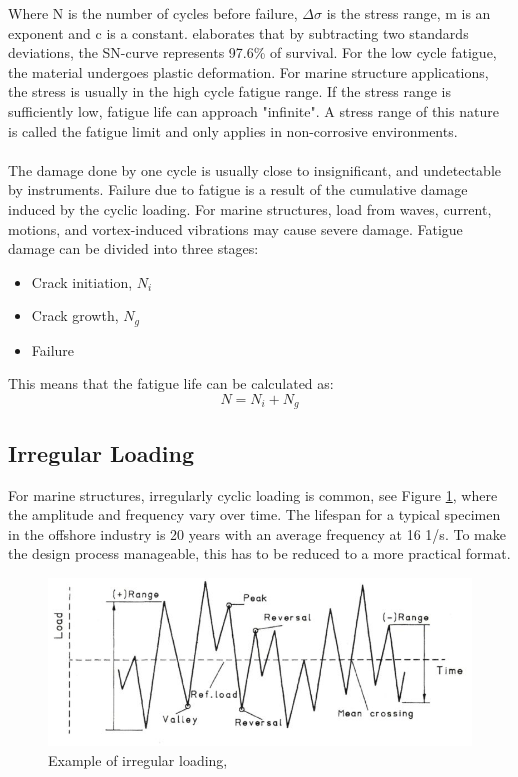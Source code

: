 Where N is the number of cycles before failure, $\Delta \sigma$ is the stress range, m is an exponent and c is a constant. \cite{dnvfatigue} elaborates that by subtracting two standards deviations, the SN-curve represents 97.6\% of survival. \newline
\newline
For the low cycle fatigue, the material undergoes plastic deformation. For marine structure applications, the stress is usually in the high cycle fatigue range. If the stress range is sufficiently low, fatigue life can approach "infinite". A stress range of this nature is called the fatigue limit and only applies in non-corrosive environments. \\\\ The damage done by one cycle is usually close to insignificant, and undetectable by instruments. Failure due to fatigue is a result of the cumulative damage induced by the cyclic loading. For marine structures, load from waves, current, motions, and vortex-induced vibrations may cause severe damage. Fatigue damage can be divided into three stages:
 \begin{itemize}
     \item Crack initiation, $N_i$
     \item Crack growth, $N_g$
     \item Failure
 \end{itemize}
 This means that the fatigue life can be calculated as:
 \begin{equation}
     N=N_i+N_g
 \end{equation}
 
\subsection{Irregular Loading}
For marine structures, irregularly cyclic loading is common, see Figure \ref{fig:irr}, where the amplitude and frequency vary over time. The lifespan for a typical specimen in the offshore industry is 20 years with an average frequency at 16 1/s. To make the design process manageable, this has to be reduced to a more practical format.  

\begin{figure}[H]
\centering
\includegraphics[scale=0.8]{figures/irr}
\caption[$\; \:$Example of irregular loading]{Example of irregular loading, \cite{fatigue2016} }
 \label{fig:irr}
\end{figure}

